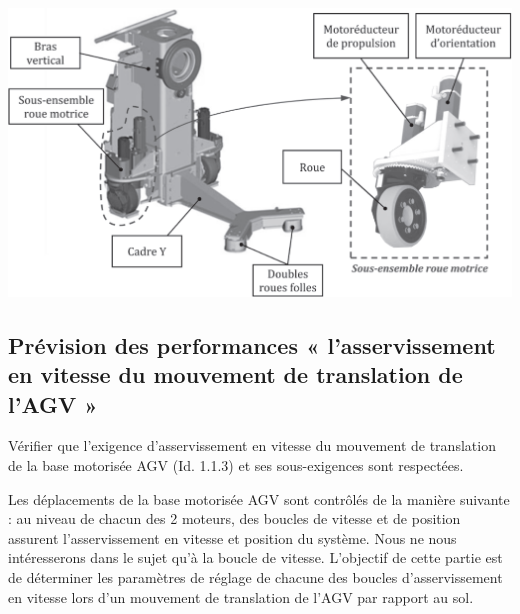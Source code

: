 \begin{multicols}{2}
\begin{multicols}{2}
\begin{center}
\includegraphics[width=.8\linewidth]{images/ccp_06}
\end{center}

\subsection*{Prévision des performances « l’asservissement en vitesse du mouvement de translation de
l’AGV »}

\begin{obj}
Vérifier que l’exigence d’asservissement en vitesse du mouvement de translation de la base motorisée
AGV (Id. 1.1.3) et ses sous-exigences sont respectées.
\end{obj}
Les déplacements de la base motorisée AGV sont contrôlés de la manière suivante : au niveau de
chacun des 2 moteurs, des boucles de vitesse et de position assurent l’asservissement en vitesse et
position du système. Nous ne nous intéresserons dans le sujet qu’à la boucle de vitesse. L’objectif de
cette partie est de déterminer les paramètres de réglage de chacune des boucles d’asservissement en
vitesse lors d’un mouvement de translation de l’AGV par rapport au sol.


\end{multicols}
\end{multicols}
